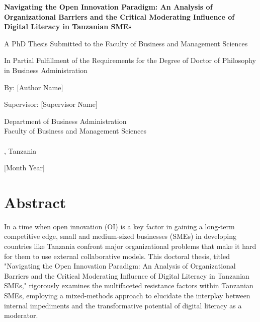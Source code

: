 \documentclass[12pt,a4paper]{article}
\begin{document}
\begin{titlepage}
\centering
\vspace*{2cm}

{\Huge\bfseries Navigating the Open Innovation Paradigm: An Analysis of Organizational Barriers and the Critical Moderating Influence of Digital Literacy in Tanzanian SMEs}

\vspace{2cm}

{\Large A PhD Thesis Submitted to the Faculty of Business and Management Sciences}

\vspace{1cm}

{\large In Partial Fulfillment of the Requirements for the Degree of Doctor of Philosophy in Business Administration}

\vspace{2cm}

{\large By: [Author Name]}

\vspace{1cm}

{\large Supervisor: [Supervisor Name]}

\vspace{1cm}

{\large Department of Business Administration\\
Faculty of Business and Management Sciences\\
[University Name]\\
[City], Tanzania}

\vspace{1cm}

{\large [Month Year]}

\end{titlepage}

\newpage
\section*{Abstract}

In a time when open innovation (OI) is a key factor in gaining a long-term competitive edge, small and medium-sized businesses (SMEs) in developing countries like Tanzania confront major organizational problems that make it hard for them to use external collaborative models. This doctoral thesis, titled "Navigating the Open Innovation Paradigm: An Analysis of Organizational Barriers and the Critical Moderating Influence of Digital Literacy in Tanzanian SMEs," rigorously examines the multifaceted resistance factors within Tanzanian SMEs, employing a mixed-methods approach to elucidate the interplay between internal impediments and the transformative potential of digital literacy as a moderator. 
\end{document}

